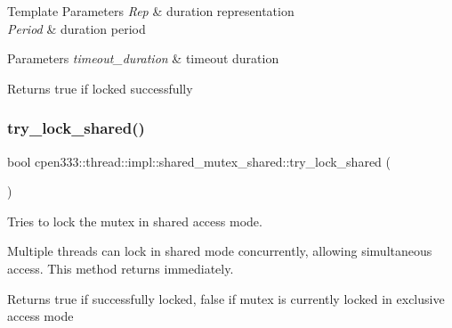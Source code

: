\begin{DoxyTemplParams}{Template Parameters}
{\em Rep} & duration representation \\
\hline
{\em Period} & duration period \\
\hline
\end{DoxyTemplParams}

\begin{DoxyParams}{Parameters}
{\em timeout\+\_\+duration} & timeout duration \\
\hline
\end{DoxyParams}
\begin{DoxyReturn}{Returns}
true if locked successfully 
\end{DoxyReturn}
\mbox{\label{classcpen333_1_1thread_1_1impl_1_1shared__mutex__shared_a147d8ab59cf14fd567135542c2302c4f}} 
\subsubsection{\texorpdfstring{try\+\_\+lock\+\_\+shared()}{try\_lock\_shared()}}
{\footnotesize\ttfamily bool cpen333\+::thread\+::impl\+::shared\+\_\+mutex\+\_\+shared\+::try\+\_\+lock\+\_\+shared (\begin{DoxyParamCaption}{ }\end{DoxyParamCaption})\hspace{0.3cm}{\ttfamily [inline]}}



Tries to lock the mutex in shared access mode. 

Multiple threads can lock in shared mode concurrently, allowing simultaneous access. This method returns immediately.

\begin{DoxyReturn}{Returns}
true if successfully locked, false if mutex is currently locked in exclusive access mode 
\end{DoxyReturn}
\mbox{\label{classcpen333_1_1thread_1_1impl_1_1shared__mutex__shared_a12d65f5e71f62d44ca910a1bf8831f13}} 
